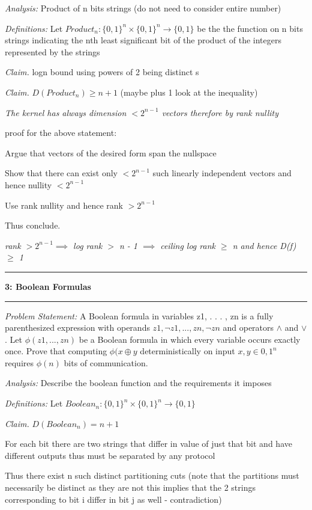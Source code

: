 \documentclass[11pt]{article}
\newcommand\question[2]{\vspace{.25in}\hrule\textbf{#1: #2}\vspace{.5em}\hrule\vspace{.10in}}
\newcommand\analysis{\vspace{.10in}\emph{Analysis: }\newline}
\newcommand\problem{\emph{Problem Statement:}\newline}
\newcommand\definitions{\emph{Definitions:}\newline}
\newcommand\claim{\emph{Claim.}\newline}
\begin{document}
\analysis
Product of n bits strings (do not need to consider entire number)

\definitions
Let $Product_n: {\{0, 1\}}^n \times {\{0, 1\}}^n \to \{0, 1\}$ be the the function on n bits strings indicating the nth least significant bit of the product of the integers represented by the strings

\claim
logn bound using powers of 2 being distinct s

\claim
$D(Product_n) \geq n + 1$ (maybe plus 1 look at the inequality)

\emph{The kernel has always dimension $< 2^{n - 1}$ vectors therefore by rank nullity}

proof for the above statement:

Argue that vectors of the desired form span the nullspace 

Show that there can exist only $< 2 ^ {n - 1}$ such linearly independent vectors and hence nullity $< 2 ^ {n - 1}$

Use rank nullity and hence rank $> 2 ^ {n - 1}$

Thus conclude. 

\emph{rank $>  2^{n - 1} \implies$ log rank $>$ n - 1 $\implies$ ceiling log rank $\geq$ n and hence D(f) $\geq$ 1}

\newpage

\question{3}{Boolean Formulas} 

\problem
A Boolean formula in variables z1, . . . , zn is a fully
parenthesized expression with operands $z1, \lnot z1, . . . , zn, \lnot zn$ and operators $\land$ and $\lor$. Let $\phi (z1, . . . , zn)$ be a Boolean formula in which every variable occurs exactly once. Prove that computing $\phi (x \oplus y$ deterministically on input $x, y \in {0, 1}^n$
requires
$\phi(n)$ bits of communication.

\analysis
Describe the boolean function and the requirements it imposes

\definitions
Let $Boolean_n: {\{0, 1\}}^n \times {\{0, 1\}}^n \to \{0, 1\}$

\claim
$D(Boolean_n) = n + 1$ 

\proof 
For each bit there are two strings that differ in value of just that bit and have different outputs thus must be separated by any protocol

Thus there exist n such distinct partitioning cuts (note that the partitions must necessarily be distinct as they are not this implies that the 2 strings corresponding to bit i differ in bit j as well - contradiction)
\end{document}
